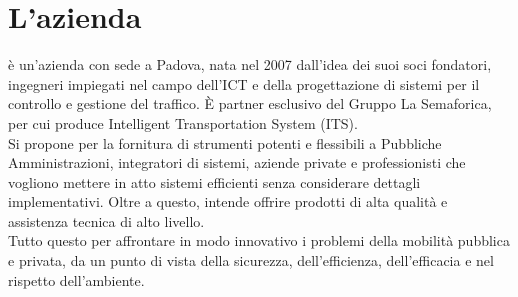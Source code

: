 \section{L'azienda}
\label{sec:azienda}

\myCompany{} è un'azienda con sede a Padova, nata nel 2007 dall'idea dei suoi soci fondatori, ingegneri impiegati nel campo dell'ICT e della progettazione di sistemi per il controllo e gestione del traffico.
È partner esclusivo del Gruppo La Semaforica, per cui produce Intelligent Transportation System (ITS).\\
Si propone per la fornitura di strumenti potenti e flessibili a Pubbliche Amministrazioni, integratori di sistemi, aziende private e professionisti che vogliono mettere in atto sistemi efficienti senza considerare dettagli implementativi.
Oltre a questo, intende offrire prodotti di alta qualità e assistenza tecnica di alto livello.\\
Tutto questo per affrontare in modo innovativo i problemi della mobilità pubblica e privata, da un punto di vista della sicurezza, dell'efficienza, dell'efficacia e nel rispetto dell'ambiente.